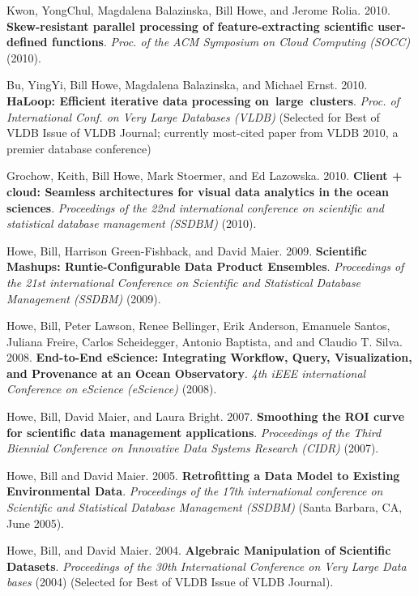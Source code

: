 \begin{bulletlist}
\item Kwon, YongChul, Magdalena Balazinska, Bill Howe, and Jerome Rolia.
2010. \textbf{Skew-resistant parallel processing of feature-extracting
scientific user-defined functions}. \emph{Proc. of the ACM Symposium on
Cloud Computing (SOCC)} (2010). 

\item Bu, YingYi, Bill Howe, Magdalena Balazinska, and Michael Ernst. 2010.
\textbf{HaLoop: Efficient iterative data processing on~large~clusters}.
\emph{Proc. of International Conf. on Very Large Databases (VLDB)} (Selected for Best of VLDB Issue of VLDB Journal; currently most-cited paper from VLDB 2010, a premier database conference)

\item Grochow, Keith, Bill Howe, Mark Stoermer, and Ed Lazowska. 2010. 
\textbf{Client + cloud: Seamless
architectures for visual data analytics in the ocean sciences}.
\emph{Proceedings of the 22nd international conference on scientific and
statistical database management (SSDBM)} (2010). 

\item Howe, Bill, Harrison Green-Fishback, and David Maier. 2009. \textbf{Scientific Mashups:
Runtie-Configurable Data Product Ensembles}. \emph{Proceedings of the
21st international Conference on Scientific and Statistical Database
Management (SSDBM)} (2009). 

\item Howe, Bill, Peter Lawson, Renee
Bellinger, Erik Anderson, Emanuele Santos, Juliana Freire, Carlos
Scheidegger, Antonio Baptista, and and Claudio T. Silva. 2008.
\textbf{End-to-End eScience: Integrating Workflow, Query, Visualization, and
Provenance at an Ocean Observatory}. \emph{4th iEEE international
Conference on eScience (eScience)} (2008).

\item Howe, Bill, David Maier, and Laura Bright. 2007. \textbf{Smoothing the ROI
curve for scientific data management applications}. \emph{Proceedings of
the Third Biennial Conference on Innovative Data Systems Research (CIDR)} 
(2007). 

\item Howe, Bill and David Maier. 2005. \textbf{Retrofitting a Data Model to Existing
Environmental Data}. \emph{Proceedings of the 17th international
conference on Scientific and Statistical Database Management (SSDBM)} 
(Santa Barbara, CA, June 2005). 

\item Howe, Bill, and David Maier. 2004.
\textbf{Algebraic Manipulation of Scientific Datasets}. 
\emph{Proceedings of the 30th International Conference on Very Large Data
bases} (2004) (Selected for Best of VLDB Issue of VLDB Journal). 


\end{bulletlist}
